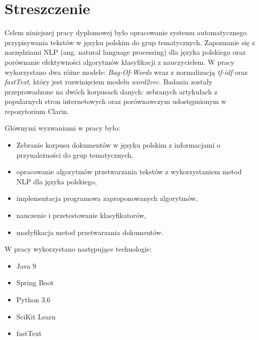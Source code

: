 \chapter*{Streszczenie}
Celem niniejszej pracy dyplomowej było opracowanie systemu automatycznego przypisywania tekstów w języku polskim do grup tematycznych. Zapoznanie się z narzędziami NLP (ang. natural language processing) dla języka polskiego oraz porównanie efektywności algorytmów klasyfikacji z nauczycielem. W pracy wykorzystano dwa różne modele: \textit{Bag-Of-Words} wraz z normalizacją \textit{tf-idf} oraz \textit{fastText}, który jest rozwinięciem modelu \textit{word2vec}. Badania zostały przeprowadzone na dwóch korpusach danych: zebranych artykułach z popularnych stron internetowych oraz porównawczym udostępnionym w repozytorium Clarin.

Głównymi wyzwaniami w pracy było:

\begin{itemize}
\item Zebranie korpusu dokumentów w języku polskim z informacjami o przynależności do grup tematycznych,
\item opracowanie algorytmów przetwarzania tekstów z wykorzystaniem metod NLP dla języka polskiego,
\item implementacja programowa zaproponowanych algorytmów,
\item nauczenie i przetestowanie klasyfikatorów,
\item modyfikacja metod przetwarzania dokumentów.
\end{itemize}

W pracy wykorzystano następujące technologie:
\begin{itemize}
\item Java 9
\item Spring Boot
\item Python 3.6
\item SciKit Learn
\item fastText
\end{itemize}

